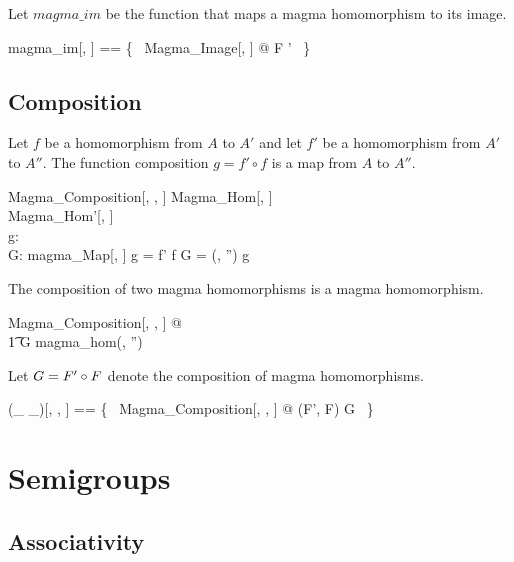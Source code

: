\documentclass{amsart}
\begin{document}
Let $magma\_im$ be the function that maps a magma homomorphism to its image.

\begin{zed}
	magma\_im[\genT, \genU] == \{~ Magma\_Image[\genT, \genU] @ F \mapsto \strucS' ~\}
\end{zed}

\subsection{Composition}

Let $f$ be a homomorphism from $A$ to $A'$ and let $f'$ be a homomorphism from $A'$ to $A''$.
The function composition $g = f' \circ f$ is a map from $A$ to $A''$.

\begin{schema}{Magma\_Composition}[\genT, \genU, \genV]
	Magma\_Hom[\genT, \genU] \\
	Magma\_Hom'[\genU, \genV] \\
	g: \genT \pfun \genV  \\
	G: magma\_Map[\genT, \genV]
\where
	g = f' \circ f
\also
	G = (\strucA, \strucA'') \mapsto g
\end{schema}

\begin{remark}
The composition of two magma homomorphisms is a magma homomorphism.

\begin{zed}
	\forall Magma\_Composition[\setT, \setU, \setV] @ \\
	\t1	G \in magma\_hom(\strucA, \strucA'')
\end{zed}

\end{remark}

Let $G = F' \mathbin{\circ} F$ denote the composition of magma homomorphisms.

\begin{zed}
	(\_ \circG \_)[\genT, \genU, \genV] == \{~ Magma\_Composition[\genT, \genU, \genV] @ (F', F) \mapsto G ~\}
\end{zed}

\section{Semigroups}

\subsection{Associativity}
\end{document}
